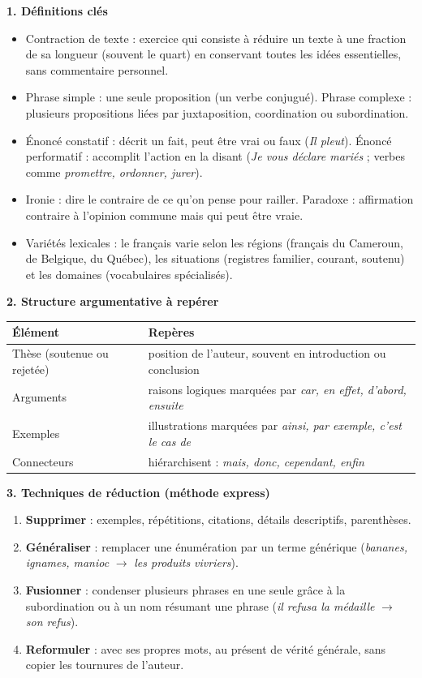 \documentclass[11pt]{article}
\newcommand{\cle}[1]{{\popxbold\color{popdark}#1}}
\begin{document}
\begin{bilan}
\textbf{1. Définitions clés}
\begin{itemize}
  \item \cle{Contraction de texte} : exercice qui consiste à réduire un texte à une fraction de sa longueur (souvent le quart) en conservant toutes les idées essentielles, sans commentaire personnel.
  \item \cle{Phrase simple} : une seule proposition (un verbe conjugué). \cle{Phrase complexe} : plusieurs propositions liées par juxtaposition, coordination ou subordination.
  \item \cle{Énoncé constatif} : décrit un fait, peut être vrai ou faux (\emph{Il pleut}). \cle{Énoncé performatif} : accomplit l'action en la disant (\emph{Je vous déclare mariés} ; verbes comme \emph{promettre, ordonner, jurer}).
  \item \cle{Ironie} : dire le contraire de ce qu'on pense pour railler. \cle{Paradoxe} : affirmation contraire à l'opinion commune mais qui peut être vraie.
  \item \cle{Variétés lexicales} : le français varie selon les régions (français du Cameroun, de Belgique, du Québec), les situations (registres familier, courant, soutenu) et les domaines (vocabulaires spécialisés).
\end{itemize}

\textbf{2. Structure argumentative à repérer}
\begin{center}
\begin{tabularx}{\linewidth}{|l|X|}\hline
\rowcolor{popblueL} \textbf{Élément} & \textbf{Repères} \\ \hline
Thèse (soutenue ou rejetée) & position de l'auteur, souvent en introduction ou conclusion \\ \hline
Arguments & raisons logiques marquées par \emph{car, en effet, d'abord, ensuite} \\ \hline
Exemples & illustrations marquées par \emph{ainsi, par exemple, c'est le cas de} \\ \hline
Connecteurs & hiérarchisent : \emph{mais, donc, cependant, enfin} \\ \hline
\end{tabularx}
\end{center}

\textbf{3. Techniques de réduction (méthode express)}
\begin{enumerate}
  \item \textbf{Supprimer} : exemples, répétitions, citations, détails descriptifs, parenthèses.
  \item \textbf{Généraliser} : remplacer une énumération par un terme générique (\emph{bananes, ignames, manioc} $\rightarrow$ \emph{les produits vivriers}).
  \item \textbf{Fusionner} : condenser plusieurs phrases en une seule grâce à la subordination ou à un nom résumant une phrase (\emph{il refusa la médaille} $\rightarrow$ \emph{son refus}).
  \item \textbf{Reformuler} : avec ses propres mots, au présent de vérité générale, sans copier les tournures de l'auteur.
\end{enumerate}


\end{bilan}
\end{document}
